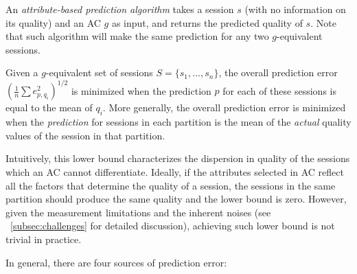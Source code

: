  An {\it
  attribute-based prediction algorithm} takes a session $s$ (with no
information on its quality) and an AC $g$ as input, and returns the
predicted quality of $s$. Note that such algorithm will make the same
prediction for any two $g$-equivalent sessions.



Given a $g$-equivalent set of sessions $S=\{s_1,\dots,s_n\}$, the
overall prediction error $\left(\frac{1}{n}\sum
  e_{p,q_i}^2\right)^{1/2}$ is minimized when the prediction $p$ for
each of these sessions is equal to the mean of $q_i$. More generally,
the overall prediction error is minimized when the \emph{prediction}
for sessions in each partition is the mean of the \emph{actual}
quality values of the session in that partition.

Intuitively, this lower bound characterizes the dispersion in quality
of the sessions which an AC cannot differentiate. Ideally, if the
attributes selected in AC reflect all the factors that determine the
quality of a session, the sessions in the same partition should
produce the same quality and the lower bound is zero. However, given
the measurement limitations and the inherent noises (see
\Section~\ref{subsec:challenges} for detailed discussion), achieving
such lower bound is not trivial in practice.


\label{subsec:challenges}

In general, there are four sources of prediction error:

